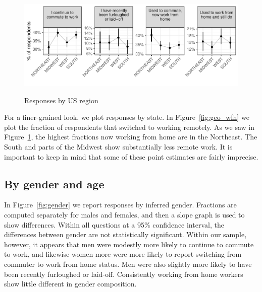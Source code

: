 \documentclass[12pt]{article}
\begin{document}
\begin{figure}
  \caption{Responses by US region} \label{fig:region}
\centering
\begin{minipage}{1.0 \linewidth}
  \includegraphics[width = \linewidth]{plots/region.pdf} \\
  \begin{footnotesize}
    \end{footnotesize}
\end{minipage}
\end{figure} 

For a finer-grained look, we plot responses by state.
In Figure~\ref{fig:geo_wfh} we plot the fraction of respondents that switched to working remotely. 
As we saw in Figure~\ref{fig:region}, the highest fractions now working from home are in the Northeast.
The South and parts of the Midwest show substantially less remote work. 
It is important to keep in mind that some of these point estimates are fairly imprecise.


\subsection{By gender and age} \label{sec:gender}

In Figure~\ref{fig:gender} we report responses by inferred gender.
Fractions are computed separately for males and females, and then a slope graph is used to show differences. Within all questions at a 95\% confidence interval, the differences between gender are not statistically significant. Within our sample, however, it appears that men were modestly more likely to continue to commute to work, and likewise women more were more likely to report switching from commuter to work from home status. Men were also slightly more likely to have been recently furloughed or laid-off. Consistently working from home workers show little different in gender composition.
\end{document}
